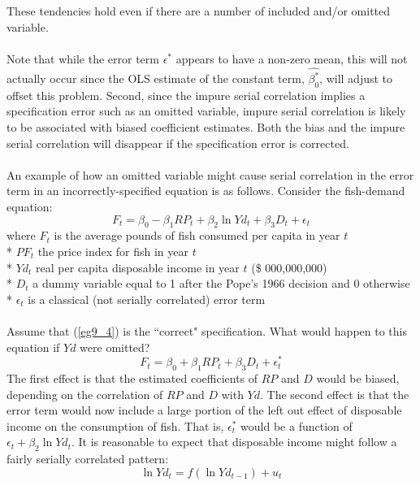\documentclass[11pt]{article}
\begin{document}
These tendencies hold even if there are a number of included and/or omitted variable.\\ \\
Note that while the error term $\epsilon^*$ appears to have a non-zero mean, this will not actually occur since the OLS estimate of the constant term, $\hat{\beta_0^*}$, will adjust to offset this problem. Second, since the impure serial correlation implies a specification error such as an omitted variable, impure serial correlation is likely to be associated with biased coefficient estimates. Both the bias and the impure serial correlation will disappear if the specification error is corrected. \\ \\
An example of how an omitted variable might cause serial correlation in the error term in an incorrectly-specified equation is as follows. Consider the fish-demand equation:
\begin{equation}
\label{eg9_4}
F_t = \beta_0 - \beta_1RP_t + \beta_2\ln Yd_t + \beta_3D_t + \epsilon_t
\end{equation}
where
$F_t$ is the average pounds of fish consumed per capita in year $t$\\*
$PF_t$ the price index for fish in year $t$\\*
$Yd_t$ real per capita disposable income in year $t$ (\$ 000,000,000)\\*
$D_t$ a dummy variable equal to 1 after the Pope's 1966 decision and 0 otherwise\\*
$\epsilon_t$ is a classical (not serially correlated) error term\\ \\
Assume that (\ref{eg9_4}) is the ``correct" specification. What would happen to this equation if $Yd$ were omitted?
\begin{equation}
F_t = \beta_0 + \beta_1RP_t + \beta_3D_t + \epsilon_t^* \label{eg9_5}
\end{equation}
The first effect is that the estimated coefficients of $RP$ and $D$ would be biased, depending on the correlation of $RP$ and $D$ with $Yd$. The second effect is that the error term would now include a large portion of the left out effect of disposable income on the consumption of fish. That is, $\epsilon_t^*$ would be a function of $\epsilon_t + \beta_2 \ln Yd_t$. It is reasonable to expect that disposable income might follow a fairly serially correlated pattern:
\begin{equation}
\ln Yd_t = f(\ln Yd_{t-1}) + u_t\label{eg9_6}
\end{equation}
\end{document}
